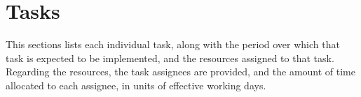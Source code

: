 \section{Tasks}

This sections lists each individual task, along with the period over which that task is expected to be implemented, and the resources assigned to that task. 
Regarding the resources, the task assignees are provided, and the amount of time allocated to each assignee, in units of effective working days.


